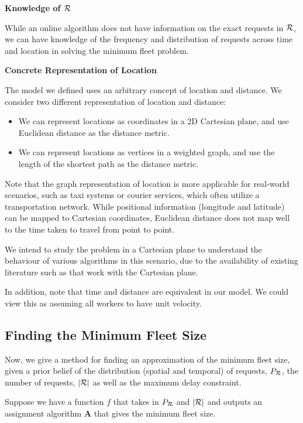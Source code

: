 \documentclass[urop]{socreport}
\begin{document}
\vspace{2mm} \noindent \textbf{Knowledge of $\mathcal{R}$}

\noindent While an online algorithm does not have information on the exact requests in $\mathcal{R}$, we can have knowledge of the frequency and distribution of requests across time and location in solving the minimum fleet problem.

\vspace{2mm} \noindent \textbf{Concrete Representation of Location}

\noindent The model we defined uses an arbitrary concept of location and distance. We consider two different representation of location and distance:

\begin{itemize}
    \item We can represent locations as coordinates in a 2D Cartesian plane, and use Euclidean distance as the distance metric.
    \item We can represent locations as vertices in a weighted graph, and use the length of the shortest path as the distance metric.
\end{itemize}

Note that the graph representation of location is more applicable for real-world scenarios, such as taxi systems or courier services, which often utilize a transportation network. While positional information (longitude and latitude) can be mapped to Cartesian coordinates, Euclidean distance does not map well to the time taken to travel from point to point.

We intend to study the problem in a Cartesian plane to understand the behaviour of various algorithms in this scenario, due to the availability of existing literature such as \cite{cheng,tong} that work with the Cartesian plane.

In addition, note that time and distance are equivalent in our model. We could view this as assuming all workers to have unit velocity.

\subsection{Finding the Minimum Fleet Size}
\label{sec:findingmfs}
Now, we give a method for finding an approximation of the minimum fleet size, given a prior belief of the distribution (spatial and temporal) of requests, $P_{\mathcal{R}}$, the number of requests, $|\mathcal{R}|$ as well as the maximum delay constraint.

Suppose we have a function $f$ that takes in $P_{\mathcal{R}}$ and $|\mathcal{R}|$ and outputs an assignment algorithm $\mathbf{A}$ that gives the minimum fleet size.
\end{document}
